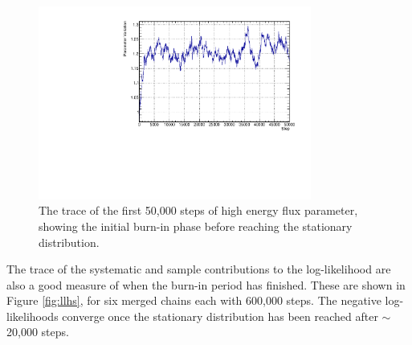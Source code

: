 \begin{figure}[!htbp]
\centering
\includegraphics*[width=0.8\textwidth,clip]{figs/burnin}
\caption{The trace of the first 50,000 steps of high energy flux parameter, showing the initial burn-in phase before reaching the stationary distribution.}\label{fig:burnin}
\end{figure}

The trace of the systematic and sample contributions to the log-likelihood are also a good measure of when the burn-in period has finished. These are shown in Figure \ref{fig:llhs}, for six merged chains each with 600,000 steps. The negative log-likelihoods converge once the stationary distribution has been reached after $\sim$20,000 steps.

